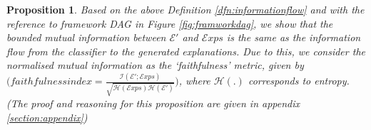 \documentclass{article}
\newcommand{\ftcom}[2][]{\todo[author=FT, #1]{#2}}
\newcommand{\ftdel}[1]{\textcolor{olive}{$\times$ #1}}
\newtheorem{prp}{Proposition}
\begin{document}

\begin{prp}
Based on the above Definition \ref{dfn:informationflow} and with the reference to framework DAG in Figure \ref{fig:framworkdag},
we show that the bounded mutual information between $\mathcal{E}'$ and $\mathcal{E}xps$ is the same as the information flow from the classifier to the generated explanations.
Due to this, we consider the normalised mutual information as the `faithfulness' metric, given by $\Big( faithfulness index = \frac{\mathcal{I}(\mathcal{E}'; \mathcal{E}xps)}{\sqrt{\mathcal{H}(\mathcal{E}xps)\mathcal{H}(\mathcal{E}')}}\Big)$, where $\mathcal{H}(.)$ corresponds to entropy.
(The proof and reasoning for this proposition are given in appendix \ref{section:appendix})
\label{prp:faithfulness}
\end{prp}



\end{document}
